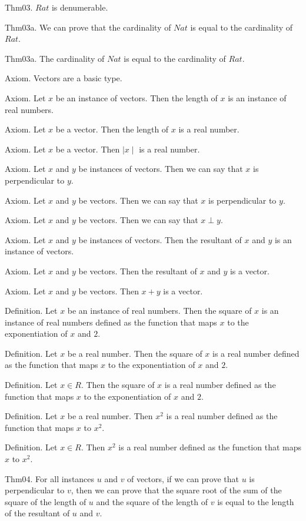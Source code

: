\documentclass{article}
\begin{document}
Thm03. $Rat$ is denumerable.

Thm03a. We can prove that the cardinality of $Nat$ is equal to the cardinality of $Rat$.

Thm03a. The cardinality of $Nat$ is equal to the cardinality of $Rat$.

Axiom. Vectors are a basic type.

Axiom. Let $x$ be an instance of vectors. Then the length of $x$ is an instance of real numbers.

Axiom. Let $x$ be a vector. Then the length of $x$ is a real number.

Axiom. Let $x$ be a vector. Then $\mid x \mid$ is a real number.

Axiom. Let $x$ and $y$ be instances of vectors. Then we can say that $x$ is perpendicular to $y$.

Axiom. Let $x$ and $y$ be vectors. Then we can say that $x$ is perpendicular to $y$.

Axiom. Let $x$ and $y$ be vectors. Then we can say that $x \perp y$.

Axiom. Let $x$ and $y$ be instances of vectors. Then the resultant of $x$ and $y$ is an instance of vectors.

Axiom. Let $x$ and $y$ be vectors. Then the resultant of $x$ and $y$ is a vector.

Axiom. Let $x$ and $y$ be vectors. Then $x + y$ is a vector.

Definition. Let $x$ be an instance of real numbers. Then the square of $x$ is an instance of real numbers defined as the function that maps $x$ to the exponentiation of $x$ and $2$.

Definition. Let $x$ be a real number. Then the square of $x$ is a real number defined as the function that maps $x$ to the exponentiation of $x$ and $2$.

Definition. Let $x \in R$. Then the square of $x$ is a real number defined as the function that maps $x$ to the exponentiation of $x$ and $2$.

Definition. Let $x$ be a real number. Then $x ^{ 2}$ is a real number defined as the function that maps $x$ to $x ^{ 2}$.

Definition. Let $x \in R$. Then $x ^{ 2}$ is a real number defined as the function that maps $x$ to $x ^{ 2}$.

Thm04. For all instances $u$ and $v$ of vectors, if we can prove that $u$ is perpendicular to $v$, then we can prove that the square root of the sum of the square of the length of $u$ and the square of the length of $v$ is equal to the length of the resultant of $u$ and $v$.
\end{document}
